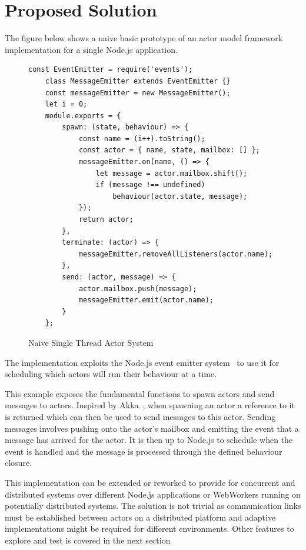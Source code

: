 \documentclass[12pt]{report}
\begin{document}
\section{Proposed Solution}
The figure below shows a naive basic prototype of an actor model framework implementation for a single Node.js application.
\begin{figure}[H]
  \begin{lstlisting}[gobble=2]
    const EventEmitter = require('events');
    class MessageEmitter extends EventEmitter {}
    const messageEmitter = new MessageEmitter();
    let i = 0;
    module.exports = {
        spawn: (state, behaviour) => {
            const name = (i++).toString();
            const actor = { name, state, mailbox: [] };
            messageEmitter.on(name, () => {
                let message = actor.mailbox.shift();
                if (message !== undefined)
                    behaviour(actor.state, message);
            });
            return actor;
        },
        terminate: (actor) => {
            messageEmitter.removeAllListeners(actor.name);
        },
        send: (actor, message) => {
            actor.mailbox.push(message);
            messageEmitter.emit(actor.name);
        }
    };
  \end{lstlisting}
  \caption{Naive Single Thread Actor System}
\end{figure}
The implementation exploits the Node.js event emitter system~\cite{nodeevents} to use it for scheduling which actors will run their behaviour at a time.

This example exposes the fundamental functions to spawn actors and send messages to actors. Inspired by Akka~\cite{stivan2015akka}, when spawning an actor a reference to it is returned which can then be used to send messages to this actor. Sending messages involves pushing onto the actor's mailbox and emitting the event that a message has arrived for the actor. It is then up to Node.js to schedule when the event is handled and the message is processed through the defined behaviour closure.

This implementation can be extended or reworked to provide for concurrent and distributed systems over different Node.js applications or WebWorkers running on potentially distributed systems. The solution is not trivial as communication links must be established between actors on a distributed platform and adaptive implementations might be required for different environments. Other features to explore and test is covered in the next section
\end{document}
